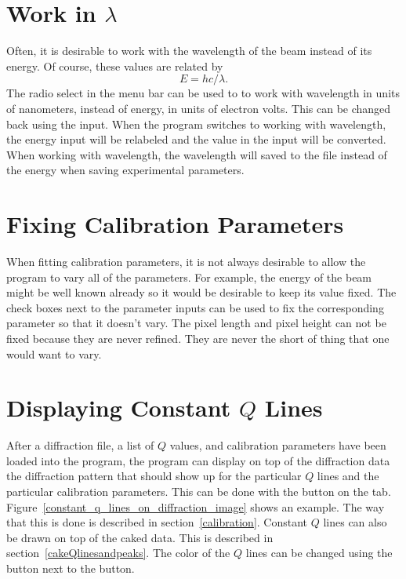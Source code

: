 \section{\texorpdfstring{Work in 
    $\lambda$}{Work in Lambda}}
    \label{workWavelength}

Often, it is desirable to work with the wavelength 
of the beam instead of its energy. Of course, these
values are related by
\begin{equation}
    E=hc/\lambda.
\end{equation}
The  radio select in the menu bar
can be used to to work with wavelength in units of nanometers, 
instead of energy, in units of electron volts. 
This can be changed back using the  input.
When the program switches to working with wavelength,
the energy input  will be relabeled
\gui{$\lambda$} and the value in the input will be converted.
When working with wavelength, the 
wavelength will saved to the file instead of the energy when
saving experimental parameters.

\section{Fixing Calibration Parameters}
\label{fix_parameters}

When fitting calibration parameters, it is not
always desirable to allow the program to vary
all of the parameters. For example,
the energy of the beam might be well known already
so it would be desirable to keep its value fixed.
The  check boxes next to the parameter
inputs can be used to fix the corresponding parameter
so that it doesn't vary.
The pixel length and pixel height can not be fixed 
because they are never refined. 
They are never the short of thing that one would want to vary.

\section{\texorpdfstring{Displaying Constant $Q$ 
    Lines}{Displaying Constant Q Lines}}
    \label{displayconstQlines}

After a diffraction file, a list of $Q$ values,
and calibration parameters have been loaded into
the program, the program can display on top of
the diffraction data the diffraction pattern that should
show up for the particular $Q$ lines and the
particular calibration parameters.
This can be done with the  button on the 
 tab. 
Figure~\ref{constant_q_lines_on_diffraction_image}
shows an example. The way that this is done is
described in section~\ref{calibration}.
Constant $Q$ lines can also be drawn on top of the
caked data. This is described in 
section~\ref{cakeQlinesandpeaks}.  The color of the 
$Q$ lines can be changed using the
 button next to the  
button.

